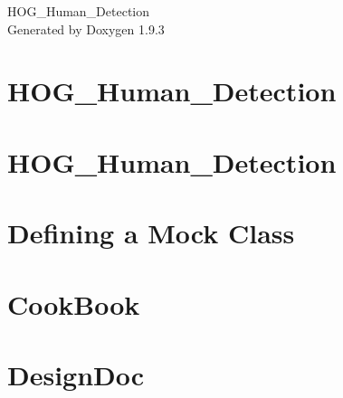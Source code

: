 \documentclass[twoside]{book}
\newcommand{\+}{\discretionary{\mbox{\scriptsize$\hookleftarrow$}}{}{}}
\newcommand{\clearemptydoublepage}{%
    \newpage{\pagestyle{empty}\cleardoublepage}%
  }
\begin{document}
  \raggedbottom
    \hypersetup{pageanchor=false,
                bookmarksnumbered=true,
                pdfencoding=unicode
               }
  \begin{titlepage}
  \vspace*{7cm}
  \begin{center}%
  {\Large HOG\+\_\+\+Human\+\_\+\+Detection}\\
  \vspace*{1cm}
  {\large Generated by Doxygen 1.9.3}\\
  \end{center}
  \end{titlepage}
  \clearemptydoublepage
  \tableofcontents
  \clearemptydoublepage
  \hypersetup{pageanchor=true}
\chapter{HOG\+\_\+\+Human\+\_\+\+Detection}
\label{md_Proposal_README}

\chapter{HOG\+\_\+\+Human\+\_\+\+Detection}
\label{md_readme}

\chapter{Defining a Mock Class}
\label{md_vendor_googletest_googlemock_docs_CheatSheet}

\chapter{Cook\+Book}
\label{md_vendor_googletest_googlemock_docs_CookBook}

\chapter{Design\+Doc}
\label{md_vendor_googletest_googlemock_docs_DesignDoc}

\end{document}
